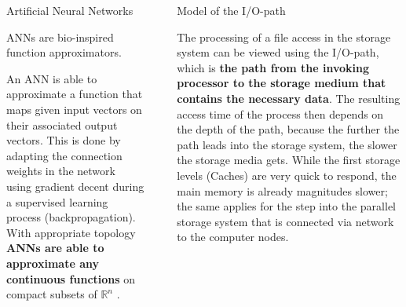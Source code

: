 \documentclass[final]{beamer}
\newlength{\sepwid}
\newlength{\onecolwid}
\begin{document}
\begin{frame}[t]
\begin{columns}[t]
\begin{column}{\onecolwid}
\begin{block}{Artificial Neural Networks}
	
	ANNs are bio-inspired function approximators.
	
	
	An ANN is able to approximate a function that maps given input vectors on their associated output vectors.
	This is done by adapting the connection weights in the network using gradient decent during a supervised learning process (backpropagation).
	With appropriate topology \textbf{ANNs are able to approximate any continuous functions} on compact subsets of $\mathbb{R}^n$ \cite{cybenko:mcss}.
	
	
\end{block}

\end{column} %

\begin{column}{\sepwid}\end{column} %

\begin{column}{\onecolwid} %
	

\begin{block}{Model of the I/O-path}
	
	The processing of a file access in the storage system can be viewed using the I/O-path, which is \textbf{the path from the invoking processor to the storage medium that contains the necessary data}.
	The resulting access time of the process then depends on the depth of the path, because the further the path leads into the storage system, the slower the storage media gets.
	While the first storage levels (Caches) are very quick to respond, the main memory is already magnitudes slower; the same applies for the step into the parallel storage system that is connected via network to the computer nodes. %
		
	

\end{block}
\end{column}
\end{columns}
\end{frame}
\end{document}
